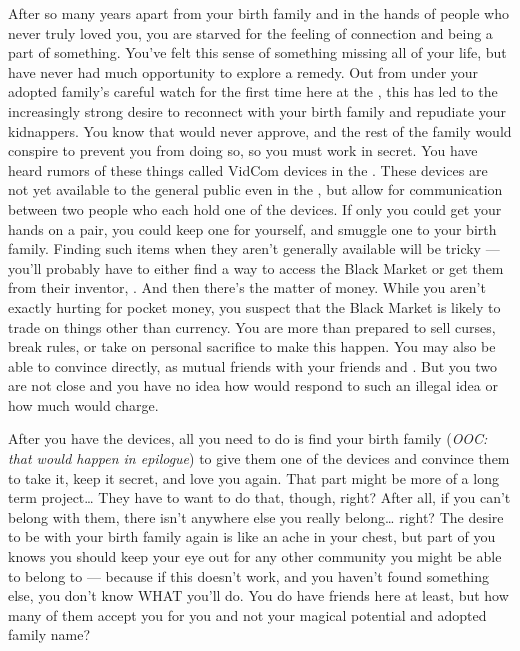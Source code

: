 \documentclass[char]{GL2020}
\begin{document}
After so many years apart from your birth family and in the hands of people who never truly loved you, you are starved for the feeling of connection and being a part of something. You've felt this sense of something missing all of your life, but have never had much opportunity to explore a remedy. Out from under your adopted family's careful watch for the first time here at the \pSc{}, this has led to the increasingly strong desire to reconnect with your birth family and repudiate your kidnappers. You know that \cAdoptedParentOne{} would never approve, and the rest of the family would conspire to prevent you from doing so, so you must work in secret. You have heard rumors of these things called VidCom devices in the \pTech{}. These devices are not yet available to the general public even in the \pTech{}, but allow for communication between two people who each hold one of the devices. If only you could get your hands on a pair, you could keep one for yourself, and smuggle one to your birth family. Finding such items when they aren't generally available will be tricky — you'll probably have to either find a way to access the Black Market or get them from their inventor, \cTechStar{\full}. And then there's the matter of money. While you aren't exactly hurting for pocket money, you suspect that the Black Market is likely to trade on things other than \pFarm{} currency. You are more than prepared to sell curses, break rules, or take on personal sacrifice to make this happen. You may also be able to convince \cTechStar{} directly, as \cTechStar{\they \are} mutual friends with your friends \cDisney{\full} and \cPirateChild{\full}. But you two are not close and you have no idea how \cTechStar{\they} would respond to such an illegal idea or how much \cTechStar{\they} would charge.

After you have the devices, all you need to do is find your birth family (\emph{OOC: that would happen in epilogue}) to give them one of the devices and convince them to take it, keep it secret, and love you again. That part might be more of a long term project\ldots{} They have to want to do that, though, right? After all, if you can't belong with them, there isn't anywhere else you really belong\ldots{} right? The desire to be with your birth family again is like an ache in your chest, but part of you knows you should keep your eye out for any other community you might be able to belong to — because if this doesn't work, and you haven’t found something else, you don't know WHAT you'll do. You do have friends here at least, but how many of them accept you for you and not your magical potential and adopted family name?
\end{document}
